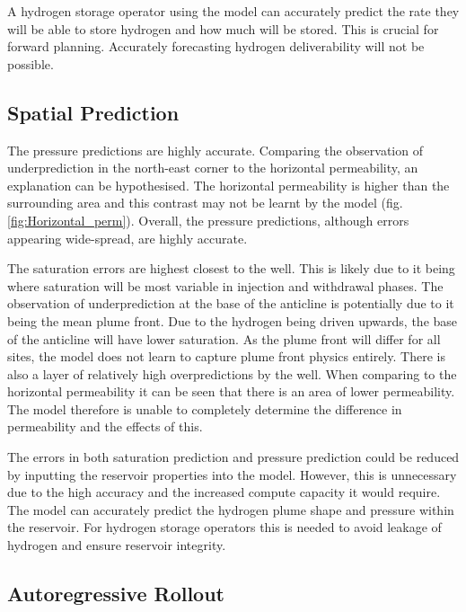 A hydrogen storage operator using the model can accurately predict the rate they will be able to store hydrogen and how much will be stored. This is crucial for forward planning. Accurately forecasting hydrogen deliverability will not be possible.

\subsection{Spatial Prediction}

The pressure predictions are highly accurate. Comparing the observation of underprediction in the north-east corner to the horizontal permeability, an explanation can be hypothesised. The horizontal permeability is higher than the surrounding area and this contrast may not be learnt by the model (fig. \ref{fig:Horizontal_perm}). Overall, the pressure predictions, although errors appearing wide-spread, are highly accurate. 

The saturation errors are highest closest to the well. This is likely due to it being where saturation will be most variable in injection and withdrawal phases. The observation of underprediction at the base of the anticline is potentially due to it being the mean plume front. Due to the hydrogen being driven upwards, the base of the anticline will have lower saturation. As the plume front will differ for all sites, the model does not learn to capture plume front physics entirely. There is also a layer of relatively high overpredictions by the well. When comparing to the horizontal permeability it can be seen that there is an area of lower permeability. The model therefore is unable to completely determine the difference in permeability and the effects of this. 

The errors in both saturation prediction and pressure prediction could  be reduced by inputting the reservoir properties into the model. However, this is unnecessary due to the high accuracy and the increased compute capacity it would require. The model can accurately predict the hydrogen plume shape and pressure within the reservoir. For hydrogen storage operators this is needed to avoid leakage of hydrogen and ensure reservoir integrity.

\subsection{Autoregressive Rollout}

